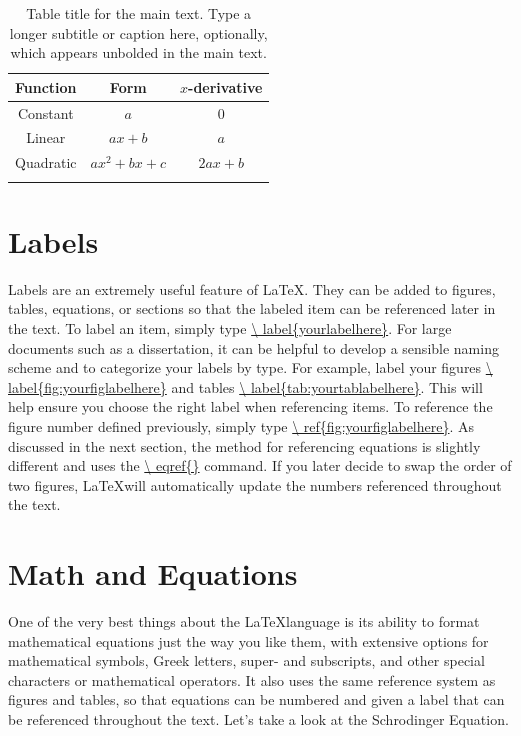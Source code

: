 \begin{table}
\caption[Table title for the Table of Contents]{ 
    Table title for the main text. %
    \textmd{Type a longer subtitle or caption here, optionally, which appears unbolded in the main text.}
    }\begin{center}
\begin{tabular}{ccc}
Function & Form & $x$-derivative \\
\hline
Constant & $a$ & 0 \\
Linear & $ax + b$ & $a$  \\
Quadratic & $ax^2 + bx + c$ & $2ax + b$  \\
\label{tab:tablelabel}
\end{tabular}
\end{center}
\end{table}


\section{Labels}

Labels are an extremely useful feature of \LaTeX. They can be added to figures, tables, equations, or sections so that the labeled item can be referenced later in the text. To label an item, simply type \url{\ label{yourlabelhere}}. For large documents such as a dissertation, it can be helpful to develop a sensible naming scheme and to categorize your labels by type. For example, label your figures \url{\ label{fig:yourfiglabelhere}} and tables \url{\ label{tab:yourtablabelhere}}. This will help ensure you choose the right label when referencing items. To reference the figure number defined previously, simply type \url{\ ref{fig:yourfiglabelhere}}. As discussed in the next section, the method for referencing equations is slightly different and uses the \url{\ eqref{}} command. If you later decide to swap the order of two figures, \LaTeX will automatically update the numbers referenced throughout the text.

\section{Math and Equations}

One of the very best things about the \LaTeX language is its ability to format mathematical equations just the way you like them, with extensive options for mathematical symbols, Greek letters, super- and subscripts, and other special characters or mathematical operators. It also uses the same reference system as figures and tables, so that equations can be numbered and given a label that can be referenced throughout the text. Let's take a look at the Schrodinger Equation.

